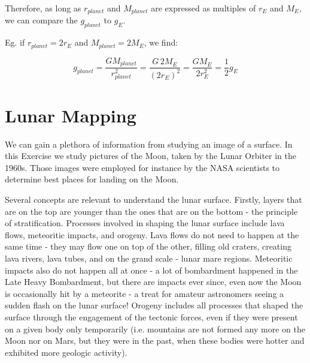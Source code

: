 \documentclass[paper=a4, fontsize=11pt]{scrartcl} %
\numberwithin{equation}{section} %
\begin{document}
Therefore, as long as $r_{planet}$ and $M_{planet}$ are expressed as multiples of $r_{E}$ and $M_{E}$, we can compare the $g_{planet}$ to $g_{E}$.
\newline

Eg. if $r_{planet} = 2 r_{E}$ and  $M_{planet} = 2 M_{E}$, we find:



\begin{equation}
g_{planet} = \frac{GM_{planet}}{r_{planet}^{2}} = \frac{G \, 2 M_{E}}{(2 r_{E})^{2}} = \frac{G M_{E}}{2 r_{E}^{2}}= \frac{1}{2} g_{E}
\end{equation}

\newpage





\section{Lunar Mapping }

We can gain a plethora of information from studying an image of a surface. In this Exercise we study pictures of the Moon, taken by the Lunar Orbiter in the 1960s. Those images were employed for instance by the NASA scientists to determine best places for landing on the Moon. 

Several concepts are relevant to understand the  lunar surface.  Firstly,  layers that are on the top are younger than the ones that are on the bottom - the principle of stratification.  Processes involved in shaping the lunar surface include lava flows,  meteoritic impacts, and orogeny.  Lava flows do not need to happen at the same time - they may flow one on top of the other, filling old craters, creating lava rivers,  lava tubes, and on the grand scale  - lunar mare regions.  Meteoritic impacts also do not happen all at once - a lot of bombardment happened in the Late Heavy Bombardment, but there are impacts ever since, even now the Moon is occasionally hit by a meteorite - a treat for amateur  astronomers seeing a sudden flash on the lunar surface!   Orogeny includes all processes that shaped the surface through the engagement of the tectonic  forces, even if they were present on a given body only temporarily (i.e. mountains are not formed any more on the Moon nor on Mars, but they were in the past, when these bodies were hotter and exhibited more geologic activity). 
\end{document}

